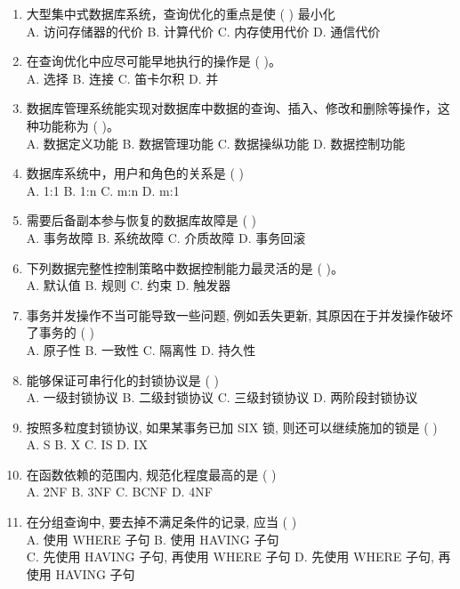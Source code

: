 \documentclass{ctexart} %
\begin{document}
\begin{enumerate}[label=\arabic*., resume] %
    \item 大型集中式数据库系统，查询优化的重点是使 ( ) 最小化 \\
    A. 访问存储器的代价 \quad B. 计算代价 \quad C. 内存使用代价 \quad D. 通信代价
    \item 在查询优化中应尽可能早地执行的操作是 ( )。\\
    A. 选择 \quad B. 连接 \quad C. 笛卡尔积 \quad D. 并
    \item 数据库管理系统能实现对数据库中数据的查询、插入、修改和删除等操作，这种功能称为 ( )。\\
    A. 数据定义功能 \quad B. 数据管理功能 \quad C. 数据操纵功能 \quad D. 数据控制功能
    \item 数据库系统中，用户和角色的关系是 ( ) \\
    A. 1:1 \quad B. 1:n \quad C. m:n \quad D. m:1
    \item 需要后备副本参与恢复的数据库故障是 ( ) \\
    A. 事务故障 \quad B. 系统故障 \quad C. 介质故障 \quad D. 事务回滚
    \item 下列数据完整性控制策略中数据控制能力最灵活的是 ( )。\\
    A. 默认值 \quad B. 规则 \quad C. 约束 \quad D. 触发器
    \item 事务并发操作不当可能导致一些问题, 例如丢失更新, 其原因在于并发操作破坏了事务的 ( ) \\
    A. 原子性 \quad B. 一致性 \quad C. 隔离性 \quad D. 持久性
    \item 能够保证可串行化的封锁协议是 ( ) \\
    A. 一级封锁协议 \quad B. 二级封锁协议 \quad C. 三级封锁协议 \quad D. 两阶段封锁协议
    \item 按照多粒度封锁协议, 如果某事务已加 SIX 锁, 则还可以继续施加的锁是 ( ) \\
    A. S \quad B. X \quad C. IS \quad D. IX
    \item 在函数依赖的范围内, 规范化程度最高的是 ( ) \\
    A. 2NF \quad B. 3NF \quad C. BCNF \quad D. 4NF
    \item 在分组查询中, 要去掉不满足条件的记录, 应当 ( ) \\
    A. 使用 WHERE 子句 \quad B. 使用 HAVING 子句 \\
    C. 先使用 HAVING 子句, 再使用 WHERE 子句 \quad D. 先使用 WHERE 子句, 再使用 HAVING 子句

\end{enumerate}
\end{document}
